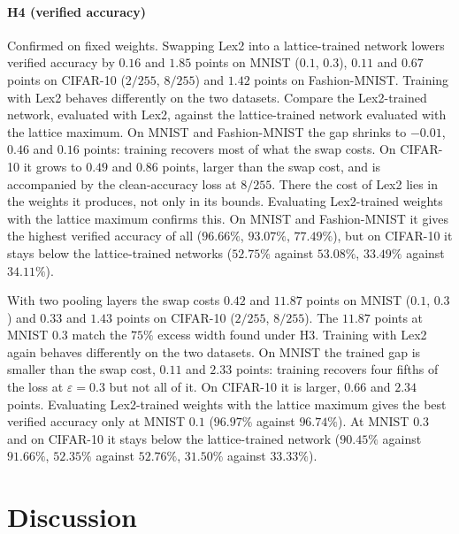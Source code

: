 \documentclass[preprint,12pt]{elsarticle}
\theoremstyle{definition}
\newcommand{\eps}{\varepsilon}
\begin{document}
\paragraph{H4 (verified accuracy)} Confirmed on fixed weights. Swapping Lex2 into a lattice-trained network lowers verified accuracy by $0.16$ and $1.85$ points on MNIST ($0.1$, $0.3$), $0.11$ and $0.67$ points on CIFAR-10 ($2/255$, $8/255$) and $1.42$ points on Fashion-MNIST. Training with Lex2 behaves differently on the two datasets. Compare the Lex2-trained network, evaluated with Lex2, against the lattice-trained network evaluated with the lattice maximum. On MNIST and Fashion-MNIST the gap shrinks to $-0.01$, $0.46$ and $0.16$ points: training recovers most of what the swap costs. On CIFAR-10 it grows to $0.49$ and $0.86$ points, larger than the swap cost, and is accompanied by the clean-accuracy loss at $8/255$. There the cost of Lex2 lies in the weights it produces, not only in its bounds. Evaluating Lex2-trained weights with the lattice maximum confirms this. On MNIST and Fashion-MNIST it gives the highest verified accuracy of all ($96.66\%$, $93.07\%$, $77.49\%$), but on CIFAR-10 it stays below the lattice-trained networks ($52.75\%$ against $53.08\%$, $33.49\%$ against $34.11\%$).

With two pooling layers the swap costs $0.42$ and $11.87$ points on MNIST ($0.1$, $0.3$) and $0.33$ and $1.43$ points on CIFAR-10 ($2/255$, $8/255$). The $11.87$ points at MNIST $0.3$ match the $75\%$ excess width found under H3. Training with Lex2 again behaves differently on the two datasets. On MNIST the trained gap is smaller than the swap cost, $0.11$ and $2.33$ points: training recovers four fifths of the loss at $\eps=0.3$ but not all of it. On CIFAR-10 it is larger, $0.66$ and $2.34$ points. Evaluating Lex2-trained weights with the lattice maximum gives the best verified accuracy only at MNIST $0.1$ ($96.97\%$ against $96.74\%$). At MNIST $0.3$ and on CIFAR-10 it stays below the lattice-trained network ($90.45\%$ against $91.66\%$, $52.35\%$ against $52.76\%$, $31.50\%$ against $33.33\%$).

\section{Discussion}
\label{sec:discussion}
\end{document}

